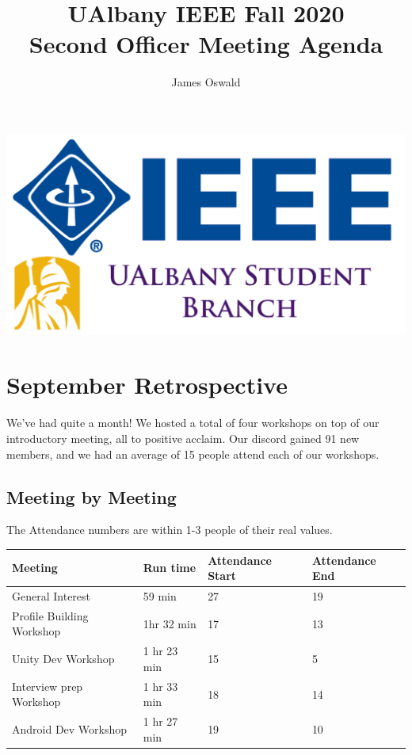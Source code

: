 \documentclass{article}
\author{James Oswald}
\title{UAlbany IEEE Fall 2020 \\ Second Officer Meeting Agenda}
\begin{document}
\maketitle
\thispagestyle{fancy}
\centering
\includegraphics[scale=0.2]{Logo.png}
\tableofcontents
\newpage
\raggedright

\section{September Retrospective}
\paragraph{}

We've had quite a month! We hosted a total of four workshops on top of our introductory meeting, all to positive acclaim. Our discord gained 91 new members, and we had an average of 15 people attend each of our workshops.

\subsection{Meeting by Meeting}
The Attendance numbers are within 1-3 people of their real values. 
\begin{table}[H]
\begin{tabular}{| m{4.6cm} | m{2.2cm} | m{2.3cm} | m{2.3cm} |}
\hline
\textbf{Meeting} & \textbf{Run time} & \textbf{Attendance Start} & \textbf{Attendance End} \\
\hline
General Interest & 59 min & 27 & 19 \\
\hline
Profile Building Workshop & 1hr 32 min & 17 & 13\\
\hline
Unity Dev Workshop & 1 hr 23 min & 15 & 5\\
\hline
Interview prep Workshop & 1 hr 33 min & 18 & 14\\
\hline
Android Dev Workshop & 1 hr 27 min & 19 & 10\\
\hline
\end{tabular}
\end{table}
\end{document}
